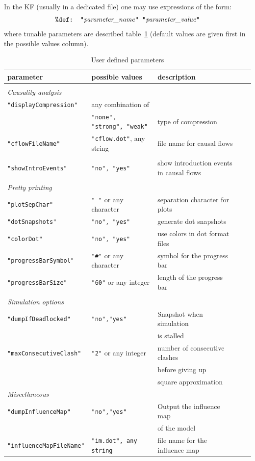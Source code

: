\documentclass[11pt]{book}
\def\ttt#1{\texttt{#1}}
\begin{document}
In the KF (usually in a dedicated file) one may use expressions of the form:
\[
\hbox{\ttt{\%def: "}\textit{parameter\_name}\ttt{" "}\textit{parameter\_value}\ttt{"}}
\]
where tunable parameters are described table~\ref{tab:parameters} (default values are given first in the possible values column).
\begin{table}[ht]
\caption{User defined parameters}
\begin{tabular}{l|l|lll}
parameter & possible values & description \\
\hline &\\
\textit{Causality analysis}&\\
\ttt{"displayCompression"} & any combination of \\
&  \ttt{"none", "strong", "weak"} & \small type of compression \\
\ttt{"cflowFileName"} & \ttt{"cflow.dot"}, any string & \small file name for causal flows\\ & \\
\ttt{"showIntroEvents"} & \ttt{"no", "yes"} & \small show introduction events in causal flows\\ & \\
\textit{Pretty printing}&\\
\ttt{"plotSepChar"} & \ttt{" "} or any character & \small separation character for plots\\
\ttt{"dotSnapshots"} & \ttt{"no", "yes"} & \small generate dot snapshots\\
\ttt{"colorDot"} &  \ttt{"no", "yes"} & \small use colors in dot format files\\
\ttt{"progressBarSymbol"} & \ttt{"\#"} or any character & \small symbol for the progress bar\\
\ttt{"progressBarSize"} & \ttt{"60"} or any integer & \small length of the progress bar\\ &&\\
\textit{Simulation options} &\\
\ttt{"dumpIfDeadlocked"} & \ttt{"no","yes"} & \small Snapshot when simulation \\&&\small is stalled\\
\ttt{"maxConsecutiveClash"} & \ttt{"2"} or any integer & \small number of consecutive clashes \\ && \small before giving up \\ && \small square approximation\\
\textit{Miscellaneous} &\\
\ttt{"dumpInfluenceMap"} & \ttt{"no","yes"} & \small Output the influence map \\ &&\small of the model\\
\ttt{"influenceMapFileName"} & \ttt{"im.dot", any string} & \small file name for the influence map\\

\end{tabular}
\label{tab:parameters}
\end{table}
\end{document}

